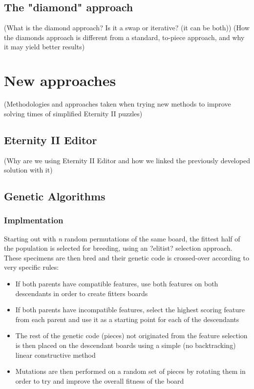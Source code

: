 \documentclass{llncs}
\begin{document}
\subsection{The "diamond" approach}

(What is the diamond approach? Is it a swap or iterative? (it can be both))
(How the diamonds approach is different from a standard, to-piece approach, and why it may yield better results)


\section{New approaches}

(Methodologies and approaches taken when trying new methods to improve solving times of simplified Eternity II puzzles)

\subsection{Eternity II Editor}

(Why are we using Eternity II Editor and how we linked the previously developed solution with it)

\subsection{Genetic Algorithms}

\subsubsection{Implmentation}\label{sec:implementation}

Starting out with \textit{n} random permutations of the same board, the fittest half of the population is selected for breeding, using an ?elitist? selection approach. These specimens are then bred and their genetic code is crossed-over according to very specific rules:

\begin{itemize}
	\item If both parents have compatible features, use both features on both descendants in order to create fitters boards
	\item If both parents have incompatible features, select the highest scoring feature from each parent and use it as a starting point for each of the descendants
	\item The rest of the genetic code (pieces) not originated from the feature selection is then placed on the descendant boards using a simple (no backtracking) linear constructive method
	\item Mutations are then performed on a random set of pieces by rotating them in order to try and improve the overall fitness of the board
\end{itemize}
\end{document}

